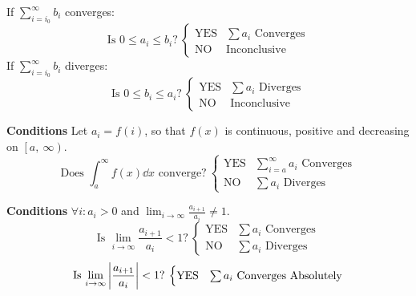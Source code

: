 \documentclass{article}
\theoremstyle{plain}
\numberwithin{theorem}{subsection}
\theoremstyle{definition}
\numberwithin{definition}{subsection}
\theoremstyle{remark}
\numberwithin{note}{subsection}
\begin{document}
\begin{multicols}{2}
\begin{mdframed}[style=exampledefaultcols,frametitle={Comparison Test}]
		\noindent If $\displaystyle \sum_{i=i_0}^\infty b_i$ converges:
		\begin{equation*}
			\text{Is $0\leqslant a_i \leqslant b_i$?}\:
			\begin{cases}
				\text{YES} & \text{$\sum a_i$ Converges} \\
				\text{NO} & \text{Inconclusive}
			\end{cases}
		\end{equation*}
		If $\displaystyle \sum_{i=i_0}^\infty b_i$ diverges:
		\begin{equation*}
			\text{Is $0\leqslant b_i \leqslant a_i$?}\:
			\begin{cases}
				\text{YES} & \text{$\sum a_i$ Diverges} \\
				\text{NO} & \text{Inconclusive}
			\end{cases}
		\end{equation*}
	\end{mdframed}
	\begin{mdframed}[style=exampledefaultcols,frametitle={Integral Test}]
		\textbf{Conditions} Let $a_i=f(i)$, so that $f(x)$ is continuous, positive and decreasing on $\left[a,\:\infty\right)$.
		\begin{equation*}
			\text{Does $\int_a^\infty f(x) \dd{x}$ converge?}\:
			\begin{cases}
				\text{YES} & \text{$\sum_{i=a}^\infty a_i$ Converges} \\
				\text{NO} & \text{$\sum a_i$ Diverges}
			\end{cases}
		\end{equation*}
	\end{mdframed}
	\begin{mdframed}[style=exampledefaultcols,frametitle={Ratio Test}]
		\textbf{Conditions} $\forall i:a_i>0$ and $\displaystyle \lim_{i\to\infty}\frac{a_{i+1}}{a_i}\neq 1$.
		\begin{equation*}
			\text{Is $\lim_{i\to\infty}\frac{a_{i+1}}{a_i} < 1$?}\:
			\begin{cases}
				\text{YES} & \text{$\sum a_i$ Converges} \\
				\text{NO} & \text{$\sum a_i$ Diverges}
			\end{cases}
		\end{equation*}
		\begin{equation*}
			\text{Is $\lim_{i\to\infty}\abs{\frac{a_{i+1}}{a_i}} < 1$?}\:
			\begin{cases}
				\text{YES} & \text{$\sum a_i$ Converges Absolutely} \\

\end{cases}
\end{equation*}
\end{mdframed}
\end{multicols}
\end{document}
